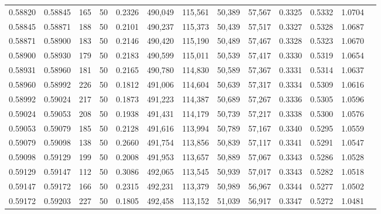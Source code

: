 \begin{tabular}{rrrrrrrrrrrrr}
0.58820 & 0.58845 &   165 &  50 &                                     0.2326 & 490,049 & 115,561 &  50,389 &  57,567 & 0.3325 & 0.5332 & 1.0704 \\
0.58845 & 0.58871 &   188 &  50 &                                     0.2101 & 490,237 & 115,373 &  50,439 &  57,517 & 0.3327 & 0.5328 & 1.0687 \\
0.58871 & 0.58900 &   183 &  50 &                                     0.2146 & 490,420 & 115,190 &  50,489 &  57,467 & 0.3328 & 0.5323 & 1.0670 \\
0.58900 & 0.58930 &   179 &  50 &                                     0.2183 & 490,599 & 115,011 &  50,539 &  57,417 & 0.3330 & 0.5319 & 1.0654 \\
0.58931 & 0.58960 &   181 &  50 &                                     0.2165 & 490,780 & 114,830 &  50,589 &  57,367 & 0.3331 & 0.5314 & 1.0637 \\
0.58960 & 0.58992 &   226 &  50 &                                     0.1812 & 491,006 & 114,604 &  50,639 &  57,317 & 0.3334 & 0.5309 & 1.0616 \\
0.58992 & 0.59024 &   217 &  50 &                                     0.1873 & 491,223 & 114,387 &  50,689 &  57,267 & 0.3336 & 0.5305 & 1.0596 \\
0.59024 & 0.59053 &   208 &  50 &                                     0.1938 & 491,431 & 114,179 &  50,739 &  57,217 & 0.3338 & 0.5300 & 1.0576 \\
0.59053 & 0.59079 &   185 &  50 &                                     0.2128 & 491,616 & 113,994 &  50,789 &  57,167 & 0.3340 & 0.5295 & 1.0559 \\
0.59079 & 0.59098 &   138 &  50 &                                     0.2660 & 491,754 & 113,856 &  50,839 &  57,117 & 0.3341 & 0.5291 & 1.0547 \\
0.59098 & 0.59129 &   199 &  50 &                                     0.2008 & 491,953 & 113,657 &  50,889 &  57,067 & 0.3343 & 0.5286 & 1.0528 \\
0.59129 & 0.59147 &   112 &  50 &                                     0.3086 & 492,065 & 113,545 &  50,939 &  57,017 & 0.3343 & 0.5282 & 1.0518 \\
0.59147 & 0.59172 &   166 &  50 &                                     0.2315 & 492,231 & 113,379 &  50,989 &  56,967 & 0.3344 & 0.5277 & 1.0502 \\
0.59172 & 0.59203 &   227 &  50 &                                     0.1805 & 492,458 & 113,152 &  51,039 &  56,917 & 0.3347 & 0.5272 & 1.0481 \\

\end{tabular}
